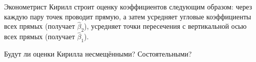 \documentclass[12pt]{article} %
\theoremstyle{definition} %
\DeclareMathOperator{\sCov}{sCov}
\DeclareMathOperator{\sVar}{sVar}
\def \cN{\mathcal{N}}
\begin{document}
\begin{enumerate}
Эконометрист Кирилл строит оценку коэффициентов следующим образом: через каждую пару точек проводит прямую, 
а затем усредняет угловые коэффициенты всех прямых (получает $\hat \beta_2$), 
усредняет точки пересечения с вертикальной осью всех прямых (получает $\hat \beta_1$).

Будут ли оценки Кирилла несмещёнными? Состоятельными? 












\end{enumerate}
\end{document}
